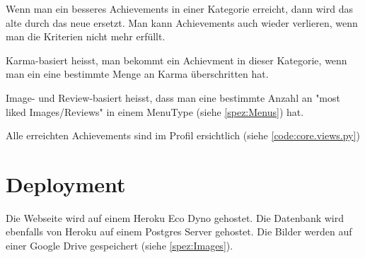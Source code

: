 Wenn man ein besseres Achievements in einer Kategorie erreicht, dann wird das alte durch das neue ersetzt. Man kann Achievements auch wieder verlieren, wenn man die Kriterien nicht mehr erfüllt.

Karma-basiert heisst, man bekommt ein Achievment in dieser Kategorie, wenn man
ein eine bestimmte Menge an Karma überschritten hat.

Image- und Review-basiert heisst, dass man eine bestimmte Anzahl an "most liked
Images/Reviews" in einem MenuType (siehe \ref{spez:Menus}) hat.

Alle erreichten Achievements sind im Profil ersichtlich (siehe \ref{code:core.views.py})

\section{Deployment} \label{spez:Deployment}

Die Webseite wird auf einem Heroku Eco Dyno gehostet. Die Datenbank wird ebenfalls
von Heroku auf einem Postgres Server gehostet. Die Bilder werden auf einer
Google Drive gespeichert (siehe \ref{spez:Images}).

